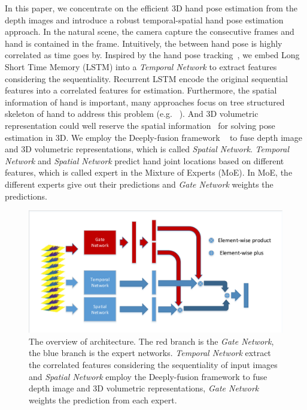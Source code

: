 \documentclass[journal,comsoc]{IEEEtran}
\let\MYoriglatexcaption\caption
\renewcommand{\caption}[2][\relax]{\MYoriglatexcaption[#2]{#2}}
\begin{document}
In this paper, we concentrate on the efficient 3D hand pose estimation from the depth images and 
introduce a robust temporal-spatial hand pose estimation approach. In the natural scene, the camera 
capture the consecutive frames and hand is contained in the frame. 
Intuitively, the between hand pose is highly correlated as time goes by. Inspired by the hand pose 
tracking~\cite{quach2016depth}, we embed Long Short Time Memory (LSTM) into a \emph{Temporal Network} 
to extract features considering the sequentiality. Recurrent LSTM encode the original sequential 
features into a correlated features for estimation. Furthermore, the spatial information of hand is 
important, many approaches focus on tree structured skeleton of hand to address this problem (e.g. 
~\cite{li20153d, wan2016direction, ye2016spatial}). And 3D volumetric representation could well reserve 
the spatial information~\cite{deng2017hand3d} for solving pose estimation in 3D. We employ the 
Deeply-fusion framework ~\cite{wang2016deeply} to fuse depth image and 3D volumetric representations, 
which is called \emph{Spatial Network}. \emph{Temporal Network} and \emph{Spatial Network} predict 
hand joint locations based on different features, which is called expert in the Mixture of Experts 
(MoE). In MoE, the different experts give out their predictions and \emph{Gate Network} weights the 
predictions.

\begin{figure}[t]
    \centering
    \includegraphics[width=1\linewidth]{src/network/architecture.pdf}
    \caption{The overview of architecture. The red branch is the \emph{Gate Network}, the blue
    branch is the expert networks. \emph{Temporal Network} extract the correlated features considering 
    the sequentiality of input images and \emph{Spatial Network} employ the Deeply-fusion framework to 
    fuse depth image and 3D volumetric representations, \emph{Gate Network} weights the prediction
    from each expert.}
\label{fig:architecture}
\end{figure}
\end{document}
